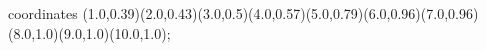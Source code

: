 					coordinates { (1.0,0.39)(2.0,0.43)(3.0,0.5)(4.0,0.57)(5.0,0.79)(6.0,0.96)(7.0,0.96)(8.0,1.0)(9.0,1.0)(10.0,1.0)};